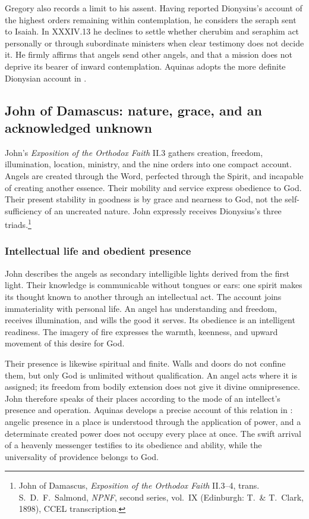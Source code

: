 Gregory also records a limit to his assent. Having reported Dionysius's account of the highest orders remaining within contemplation, he considers the seraph sent to Isaiah. In XXXIV.13 he declines to settle whether cherubim and seraphim act personally or through subordinate ministers when clear testimony does not decide it. He firmly affirms that angels send other angels, and that a mission does not deprive its bearer of inward contemplation. Aquinas adopts the more definite Dionysian account in .

\subsection{John of Damascus: nature, grace, and an acknowledged unknown}

John's \emph{Exposition of the Orthodox Faith} II.3 gathers creation, freedom, illumination, location, ministry, and the nine orders into one compact account. Angels are created through the Word, perfected through the Spirit, and incapable of creating another essence. Their mobility and service express obedience to God. Their present stability in goodness is by grace and nearness to God, not the self-sufficiency of an uncreated nature. John expressly receives Dionysius's three triads.\footnote{John of Damascus, \emph{Exposition of the Orthodox Faith} II.3--4, trans. S.~D.~F.~Salmond, \emph{NPNF}, second series, vol.~IX (Edinburgh: T.~\& T.~Clark, 1898), CCEL transcription.}


\subsubsection{Intellectual life and obedient presence}

John describes the angels as secondary intelligible lights derived from the first light. Their knowledge is communicable without tongues or ears: one spirit makes its thought known to another through an intellectual act. The account joins immateriality with personal life. An angel has understanding and freedom, receives illumination, and wills the good it serves. Its obedience is an intelligent readiness. The imagery of fire expresses the warmth, keenness, and upward movement of this desire for God.

Their presence is likewise spiritual and finite. Walls and doors do not confine them, but only God is unlimited without qualification. An angel acts where it is assigned; its freedom from bodily extension does not give it divine omnipresence. John therefore speaks of their places according to the mode of an intellect's presence and operation. Aquinas develops a precise account of this relation in : angelic presence in a place is understood through the application of power, and a determinate created power does not occupy every place at once. The swift arrival of a heavenly messenger testifies to its obedience and ability, while the universality of providence belongs to God.

